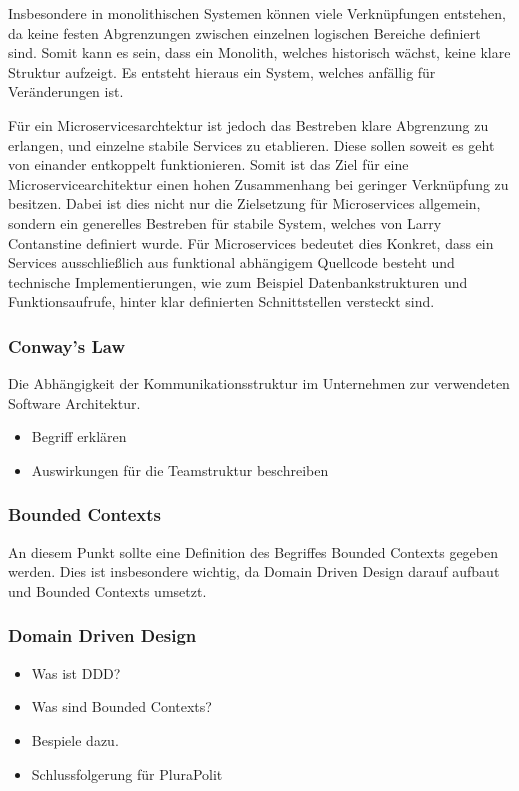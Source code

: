 Insbesondere in monolithischen Systemen können viele Verknüpfungen entstehen, da keine festen Abgrenzungen zwischen einzelnen logischen Bereiche definiert sind. Somit kann es sein, dass ein Monolith, welches historisch wächst, keine klare Struktur aufzeigt. Es entsteht hieraus ein System, welches anfällig für Veränderungen ist.

Für ein Microservicesarchtektur ist jedoch das Bestreben klare Abgrenzung zu erlangen, und einzelne stabile Services zu etablieren. Diese sollen soweit es geht von einander entkoppelt funktionieren. Somit ist das Ziel für eine Microservicearchitektur einen hohen Zusammenhang bei geringer Verknüpfung zu besitzen. Dabei ist dies nicht nur die Zielsetzung für Microservices allgemein, sondern ein generelles Bestreben für stabile System, welches von Larry Contanstine definiert wurde. Für Microservices bedeutet dies Konkret, dass ein Services ausschließlich aus funktional abhängigem Quellcode besteht und technische Implementierungen, wie zum Beispiel Datenbankstrukturen und Funktionsaufrufe, hinter klar definierten Schnittstellen versteckt sind.


\subsubsection{Conway's Law}

Die Abhängigkeit der Kommunikationsstruktur im Unternehmen zur verwendeten Software Architektur.

\begin{itemize}
	\item Begriff erklären
	\item Auswirkungen für die Teamstruktur beschreiben
\end{itemize}

\subsubsection{Bounded Contexts}

An diesem Punkt sollte eine Definition des Begriffes Bounded Contexts gegeben werden. Dies ist insbesondere wichtig, da Domain Driven Design darauf aufbaut und Bounded Contexts umsetzt.

\subsubsection{Domain Driven Design}

\begin{itemize}
	\item Was ist DDD?
	\item Was sind Bounded Contexts?
	\item 	Bespiele dazu.
	\item Schlussfolgerung für PluraPolit
\end{itemize}

